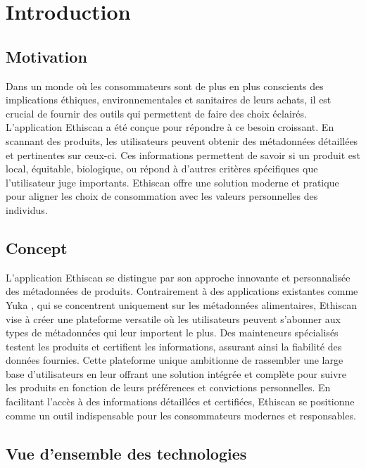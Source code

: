 \section{Introduction}

\subsection{Motivation}

Dans un monde où les consommateurs sont de plus en plus conscients des implications éthiques, environnementales et sanitaires de leurs achats, il est crucial de fournir des outils qui permettent de faire des choix éclairés. L'application Ethiscan a été conçue pour répondre à ce besoin croissant. En scannant des produits, les utilisateurs peuvent obtenir des métadonnées détaillées et pertinentes sur ceux-ci. Ces informations permettent de savoir si un produit est local, équitable, biologique, ou répond à d'autres critères spécifiques que l'utilisateur juge importants. Ethiscan offre une solution moderne et pratique pour aligner les choix de consommation avec les valeurs personnelles des individus.

\subsection{Concept}

L'application Ethiscan se distingue par son approche innovante et personnalisée des métadonnées de produits. Contrairement à des applications existantes comme Yuka \cite{yuka}, qui se concentrent uniquement sur les métadonnées alimentaires, Ethiscan vise à créer une plateforme versatile où les utilisateurs peuvent s'abonner aux types de métadonnées qui leur importent le plus. Des mainteneurs spécialisés testent les produits et certifient les informations, assurant ainsi la fiabilité des données fournies. Cette plateforme unique ambitionne de rassembler une large base d'utilisateurs en leur offrant une solution intégrée et complète pour suivre les produits en fonction de leurs préférences et convictions personnelles. En facilitant l'accès à des informations détaillées et certifiées, Ethiscan se positionne comme un outil indispensable pour les consommateurs modernes et responsables.


\subsection{Vue d'ensemble des technologies}

